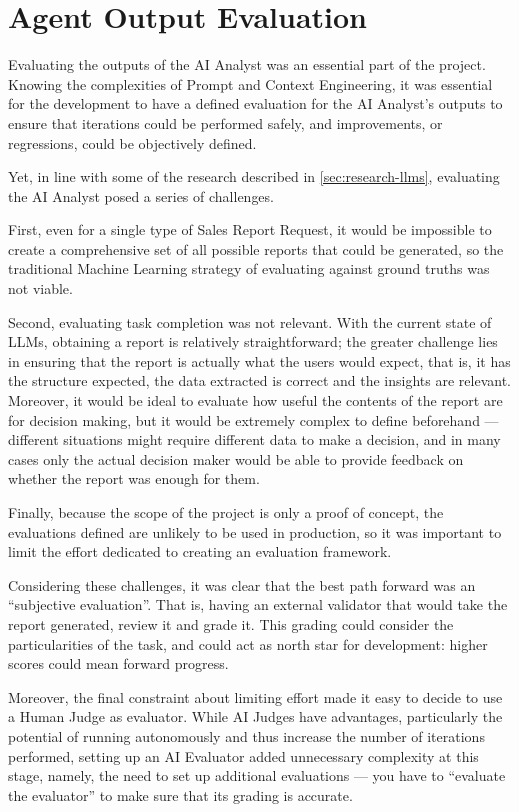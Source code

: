 \documentclass[a4paper]{report}
\begin{document}
\section{Agent Output Evaluation}
\label{sec:agent-evals}

Evaluating the outputs of the AI Analyst was an essential part of the project. Knowing the complexities of Prompt and Context Engineering, it was essential for the development to have a defined evaluation for the AI Analyst's outputs to ensure that iterations could be performed safely, and improvements, or regressions, could be objectively defined.

Yet, in line with some of the research described in \autoref{sec:research-llms}, evaluating the AI Analyst posed a series of challenges.

First, even for a single type of Sales Report Request, it would be impossible to create a comprehensive set of all possible reports that could be generated, so the traditional Machine Learning strategy of evaluating against ground truths was not viable.

Second, evaluating task completion was not relevant. With the current state of LLMs, obtaining a report is relatively straightforward; the greater challenge lies in ensuring that the report is actually what the users would expect, that is, it has the structure expected, the data extracted is correct and the insights are relevant. Moreover, it would be ideal to evaluate how useful the contents of the report are for decision making, but it would be extremely complex to define beforehand --- different situations might require different data to make a decision, and in many cases only the actual decision maker would be able to provide feedback on whether the report was enough for them.

Finally, because the scope of the project is only a proof of concept, the evaluations defined are unlikely to be used in production, so it was important to limit the effort dedicated to creating an evaluation framework.

Considering these challenges, it was clear that the best path forward was an ``subjective evaluation''. That is, having an external validator that would take the report generated, review it and grade it. This grading could consider the particularities of the task, and could act as north star for development: higher scores could mean forward progress.

Moreover, the final constraint about limiting effort made it easy to decide to use a Human Judge as evaluator. While AI Judges have advantages, particularly the potential of running autonomously and thus increase the number of iterations performed, setting up an AI Evaluator added unnecessary complexity at this stage, namely, the need to set up additional evaluations --- you have to ``evaluate the evaluator'' to make sure that its grading is accurate.
\end{document}
